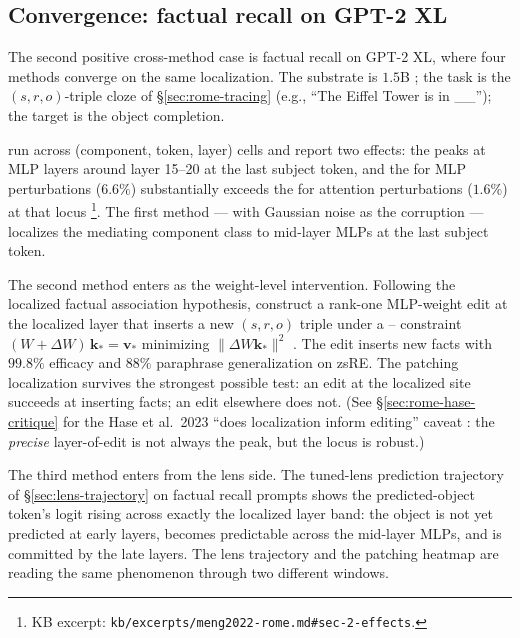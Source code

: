 \subsection{Convergence: factual recall on GPT-2 XL}
\label{sec:cross-rome}

The second positive cross-method case is factual recall on GPT-2 XL,
where four methods converge on the same localization. The substrate
is $1.5$B ; the task is the
$(s, r, o)$-triple cloze of \S\ref{sec:rome-tracing} (e.g., ``The
Eiffel Tower is in \_\_''); the target is the object completion.

\citet{meng2022-rome} run  across (component, token,
layer) cells and report two effects: the 
peaks at MLP layers around layer 15--20 at the last subject token,
and the  for MLP perturbations ($6.6\%$) substantially exceeds
the  for attention perturbations ($1.6\%$) at that locus
\citep[\S 2.3]{meng2022-rome}\footnote{KB excerpt:
\texttt{kb/excerpts/meng2022-rome.md\#sec-2-effects}.}. The first
method ---  with Gaussian noise as the corruption
--- localizes the mediating component class to mid-layer MLPs at the
last subject token.

The second method enters as the weight-level intervention. Following
the localized factual association hypothesis,
\citeauthor{meng2022-rome} construct a rank-one MLP-weight edit at
the localized layer that inserts a new $(s, r, o)$ triple under a
-- constraint
$(W + \Delta W)\,\mathbf{k}_* = \mathbf{v}_*$ minimizing
$\|\Delta W \mathbf{k}_*\|^2$ \citep[\S 3.2]{meng2022-rome}. The
edit inserts new facts with $99.8\%$ efficacy and $88\%$ paraphrase
generalization on zsRE. The patching localization survives the
strongest possible test: an edit at the localized site succeeds at
inserting facts; an edit elsewhere does not. (See
\S\ref{sec:rome-hase-critique} for the Hase et al.\ 2023 ``does
localization inform editing'' caveat
:
the \emph{precise} layer-of-edit is not always the  peak, but
the locus is robust.)

The third method enters from the lens side. The tuned-lens
prediction trajectory of \S\ref{sec:lens-trajectory} on factual
recall prompts shows the predicted-object token's logit rising
across exactly the localized layer band: the object is not yet
predicted at early layers, becomes predictable across the mid-layer
MLPs, and is committed by the late layers. The lens trajectory and
the patching heatmap are reading the same phenomenon through two
different windows.

